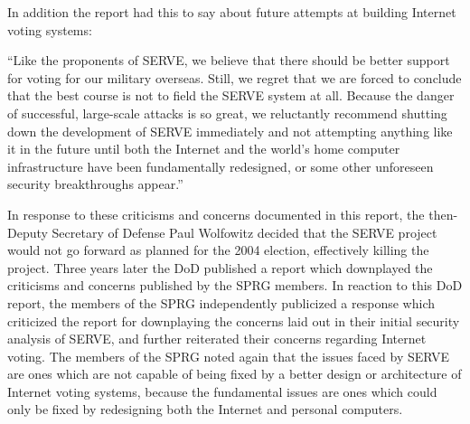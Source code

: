 
In addition the report had this to say about future attempts at building
Internet voting systems:

\begin{displayquote}
  ``Like the proponents of SERVE, we believe that there should be better support
  for voting for our military overseas. Still, we regret that we are forced to
  conclude that the best course is not to field the SERVE system at all. Because
  the danger of successful, large-scale attacks is so great, we reluctantly
  recommend shutting down the development of SERVE immediately and not
  attempting anything like it in the future until both the Internet and the
  world's home computer infrastructure have been fundamentally redesigned, or
  some other unforeseen security breakthroughs appear.''\cite{serve-analysis}
\end{displayquote}

In response to these criticisms and concerns documented in this report, the
then-Deputy Secretary of Defense Paul Wolfowitz decided that the SERVE project
would not go forward as planned for the 2004 election, effectively killing the
project.\cite{dod-expanding-electronic-voting} Three years later the DoD
published a report which downplayed the criticisms and concerns published by the
SPRG members.\cite{dod-expanding-electronic-voting} In reaction to this DoD
report, the members of the SPRG independently publicized a response which
criticized the report for downplaying the concerns laid out in their initial
security analysis of SERVE, and further reiterated their concerns regarding
Internet voting. The members of the SPRG noted again that the issues faced by
SERVE are ones which are not capable of being fixed by a better design or
architecture of Internet voting systems, because the fundamental issues are ones
which could only be fixed by redesigning both the Internet and personal
computers.\cite{comment-on-dod-report}



